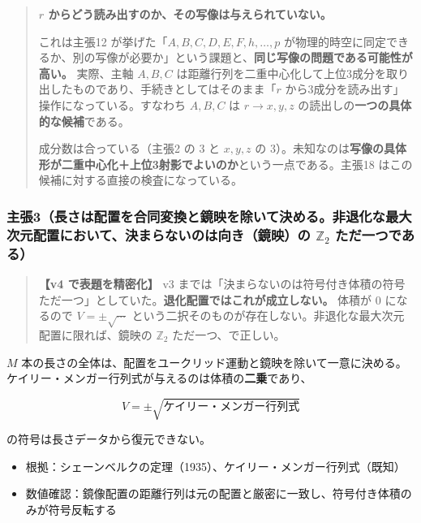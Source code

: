 \documentclass[
  10pt,
]{ltjsarticle}
\providecommand{\tightlist}{%
  \setlength{\itemsep}{0pt}\setlength{\parskip}{0pt}}
\begin{document}
\begin{quote}
\textbf{\(r\) からどう読み出すのか、その写像は与えられていない。}

これは主張12 が挙げた「\(A,B,C,D,E,F,h,\dots,p\)
が物理的時空に同定できるか、別の写像が必要か」という課題と、\textbf{同じ写像の問題である可能性が高い。}
実際、主軸 \(A, B, C\)
は距離行列を二重中心化して上位3成分を取り出したものであり、手続きとしてはそのまま「\(r\)
から3成分を読み出す」操作になっている。すなわち \(A, B, C\) は
\(r \to x, y, z\) の読出しの\textbf{一つの具体的な候補}である。

成分数は合っている（主張2 の 3 と \(x,y,z\) の
3）。未知なのは\textbf{写像の具体形が二重中心化＋上位3射影でよいのか}という一点である。主張18
はこの候補に対する直接の検査になっている。
\end{quote}

\subsubsection{\texorpdfstring{主張3（長さは配置を合同変換と鏡映を除いて決める。非退化な最大次元配置において、決まらないのは向き（鏡映）の
\(\mathbb{Z}_2\)
ただ一つである）}{主張3（長さは配置を合同変換と鏡映を除いて決める。非退化な最大次元配置において、決まらないのは向き（鏡映）の \textbackslash mathbb\{Z\}\_2 ただ一つである）}}\label{ux4e3bux5f353ux9577ux3055ux306fux914dux7f6eux3092ux5408ux540cux5909ux63dbux3068ux93e1ux6620ux3092ux9664ux3044ux3066ux6c7aux3081ux308bux975eux9000ux5316ux306aux6700ux5927ux6b21ux5143ux914dux7f6eux306bux304aux3044ux3066ux6c7aux307eux3089ux306aux3044ux306eux306fux5411ux304dux93e1ux6620ux306e-mathbbz_2-ux305fux3060ux4e00ux3064ux3067ux3042ux308b}

\begin{quote}
\textbf{【v4 で表題を精密化】} v3
までは「決まらないのは符号付き体積の符号ただ一つ」としていた。\textbf{退化配置ではこれが成立しない。}
体積が \(0\) になるので \(V = \pm\sqrt{\cdots}\)
という二択そのものが存在しない。非退化な最大次元配置に限れば、鏡映の
\(\mathbb{Z}_2\) ただ一つ、で正しい。
\end{quote}

\(M\)
本の長さの全体は、配置をユークリッド運動と鏡映を除いて一意に決める。ケイリー・メンガー行列式が与えるのは体積の\textbf{二乗}であり、

\[V = \pm\sqrt{\text{ケイリー・メンガー行列式}}\]

の符号は長さデータから復元できない。

\begin{itemize}
\tightlist
\item
  根拠：シェーンベルクの定理（1935）、ケイリー・メンガー行列式（既知）
\item
  数値確認：鏡像配置の距離行列は元の配置と厳密に一致し、符号付き体積のみが符号反転する
\end{itemize}
\end{document}
